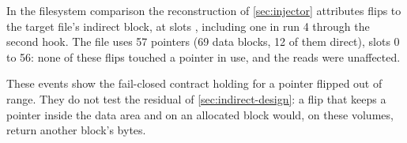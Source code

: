 In the filesystem comparison the reconstruction of
\cref{sec:injector} attributes \indHits{} flips to the target file's
indirect block, at slots \indSlots{}, including one in run 4 through the
second hook. The file uses 57 pointers (69 data blocks, 12 of them
direct), slots 0 to 56: none of these flips touched a pointer in use,
and the reads were unaffected.

These events show the fail-closed contract holding for a pointer flipped
out of range. They do not test the residual of
\cref{sec:indirect-design}: a flip that keeps a pointer inside the data
area and on an allocated block would, on these volumes, return another
block's bytes.
